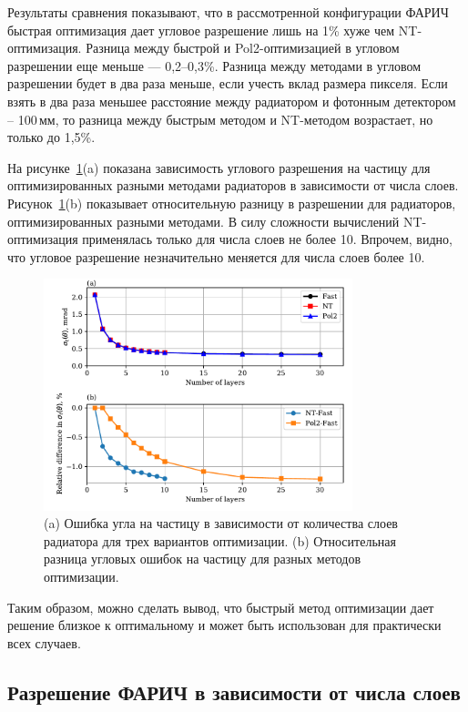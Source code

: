 \documentclass[12pt]{article}
\begin{document}
Результаты сравнения показывают, что в рассмотренной конфигурации ФАРИЧ быстрая оптимизация дает угловое разрешение лишь на 1\% хуже чем NT-оптимизация. 
Разница между быстрой и Pol2-оптимизацией в угловом разрешении еще меньше --- 0,2--0,3\%. Разница между методами в угловом разрешении будет в два 
раза меньше, если учесть вклад размера пикселя. Если взять в два раза меньшее расстояние между радиатором и фотонным детектором -- 100\,мм, 
то разница между быстрым методом и NT-методом возрастает, но только до 1,5\%.

На рисунке~\ref{fig:layersmethcomp}(a) показана зависимость углового разрешения на частицу 
для оптимизированных разными методами радиаторов в зависимости от числа слоев. Рисунок~\ref{fig:layersmethcomp}(b) показывает
относительную разницу в разрешении для радиаторов, оптимизированных разными методами.
В силу сложности вычислений NT-оптимизация применялась только для числа слоев не более 10. Впрочем, видно, что угловое разрешение
незначительно меняется для числа слоев более 10.
\begin{figure}[htbp]
\begin{center}
\includegraphics[width=0.8\textwidth]{sigtang_vs_layers_varopt.pdf}
\caption{(a) Ошибка угла на частицу в зависимости от количества слоев радиатора для трех вариантов оптимизации. 
(b) Относительная разница угловых ошибок на частицу для разных методов оптимизации.}
\label{fig:layersmethcomp}
\end{center}
\end{figure}

Таким образом, можно сделать вывод, что быстрый метод оптимизации дает решение близкое к оптимальному и может быть использован для практически всех случаев.

\subsection{Разрешение ФАРИЧ в зависимости от числа слоев}
\end{document}

